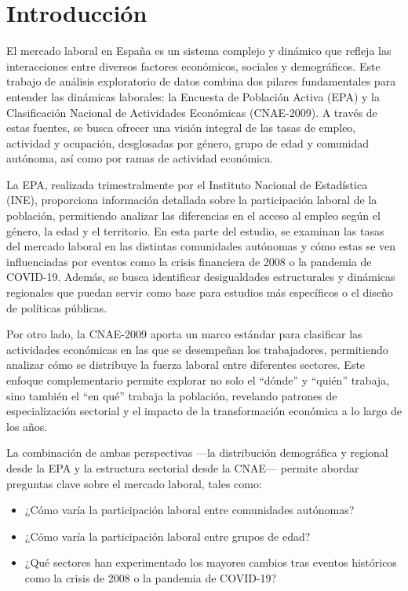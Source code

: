 \documentclass[Universitat de
València,article,submit,moreauthors,pdftex]{Definitions/mdpi}
\providecommand{\tightlist}{%
  \setlength{\itemsep}{0pt}\setlength{\parskip}{0pt}}
\begin{document}

\section{Introducción}\label{introducciuxf3n}

El mercado laboral en España es un sistema complejo y dinámico que
refleja las interacciones entre diversos factores económicos, sociales y
demográficos. Este trabajo de análisis exploratorio de datos combina dos
pilares fundamentales para entender las dinámicas laborales: la Encuesta
de Población Activa (EPA) y la Clasificación Nacional de Actividades
Económicas (CNAE-2009). A través de estas fuentes, se busca ofrecer una
visión integral de las tasas de empleo, actividad y ocupación,
desglosadas por género, grupo de edad y comunidad autónoma, así como por
ramas de actividad económica.

La EPA, realizada trimestralmente por el Instituto Nacional de
Estadística (INE), proporciona información detallada sobre la
participación laboral de la población, permitiendo analizar las
diferencias en el acceso al empleo según el género, la edad y el
territorio. En esta parte del estudio, se examinan las tasas del mercado
laboral en las distintas comunidades autónomas y cómo estas se ven
influenciadas por eventos como la crisis financiera de 2008 o la
pandemia de COVID-19. Además, se busca identificar desigualdades
estructurales y dinámicas regionales que puedan servir como base para
estudios más específicos o el diseño de políticas públicas.

Por otro lado, la CNAE-2009 aporta un marco estándar para clasificar las
actividades económicas en las que se desempeñan los trabajadores,
permitiendo analizar cómo se distribuye la fuerza laboral entre
diferentes sectores. Este enfoque complementario permite explorar no
solo el ``dónde'' y ``quién'' trabaja, sino también el ``en qué''
trabaja la población, revelando patrones de especialización sectorial y
el impacto de la transformación económica a lo largo de los años.

La combinación de ambas perspectivas ---la distribución demográfica y
regional desde la EPA y la estructura sectorial desde la CNAE--- permite
abordar preguntas clave sobre el mercado laboral, tales como:

\begin{itemize}
\tightlist
\item
  ¿Cómo varía la participación laboral entre comunidades autónomas?
\item
  ¿Cómo varía la participación laboral entre grupos de edad?
\item
  ¿Qué sectores han experimentado los mayores cambios tras eventos
  históricos como la crisis de 2008 o la pandemia de COVID-19?
\end{itemize}
\end{document}
